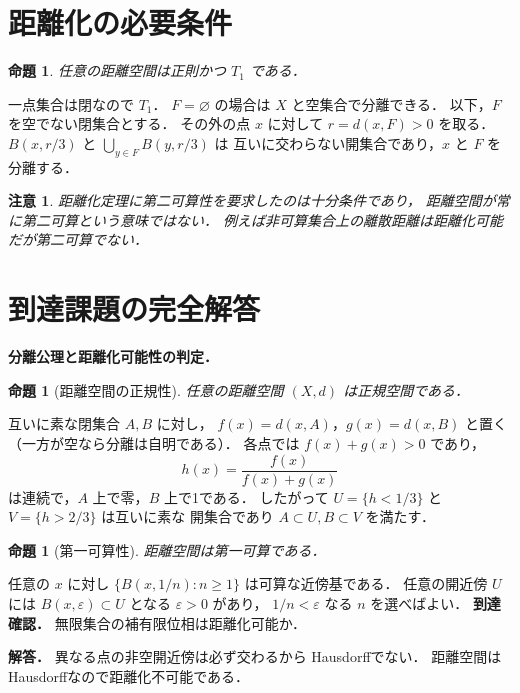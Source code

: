 \documentclass[a5paper,10pt,onecolumn]{jsarticle}
\makeatletter
\theoremstyle{mathnotetheorem}
\newtheorem{proposition}[theorem]{命題}
\newtheorem{remark}[theorem]{注意}
\renewcommand{\proofname}{証明}
\renewenvironment{proof}[1][\proofname]{%
  \par\pushQED{\qed}\normalfont\topsep4\p@\@plus2\p@\relax
  \trivlist\item[\hskip\labelsep\bfseries #1]\ignorespaces
}{\popQED\endtrivlist\@endpefalse}
\makeatother
\begin{document}
\section{距離化の必要条件}
\begin{proposition}
任意の距離空間は正則かつ $T_1$ である．
\end{proposition}
\begin{proof}
一点集合は閉なので $T_1$．
$F=\varnothing$ の場合は $X$ と空集合で分離できる．
以下，$F$ を空でない閉集合とする．
その外の点 $x$ に対して $r=d(x,F)>0$ を取る．
$B(x,r/3)$ と $\bigcup_{y\in F}B(y,r/3)$ は
互いに交わらない開集合であり，$x$ と $F$ を分離する．
\end{proof}
\begin{remark}
距離化定理に第二可算性を要求したのは十分条件であり，
距離空間が常に第二可算という意味ではない．
例えば非可算集合上の離散距離は距離化可能だが第二可算でない．
\end{remark}

\section{到達課題の完全解答}
\noindent\textbf{分離公理と距離化可能性の判定．}
\begin{proposition}[距離空間の正規性]
任意の距離空間 $(X,d)$ は正規空間である．
\end{proposition}
\begin{proof}
互いに素な閉集合 $A,B$ に対し，
$f(x)=d(x,A)$，$g(x)=d(x,B)$ と置く
（一方が空なら分離は自明である）．
各点では $f(x)+g(x)>0$ であり，
\[
h(x)=\frac{f(x)}{f(x)+g(x)}
\]
は連続で，$A$ 上で零，$B$ 上で1である．
したがって
$U=\{h<1/3\}$ と $V=\{h>2/3\}$ は互いに素な
開集合であり $A\subset U,B\subset V$ を満たす．
\end{proof}
\begin{proposition}[第一可算性]
距離空間は第一可算である．
\end{proposition}
\begin{proof}
任意の $x$ に対し
$\{B(x,1/n):n\ge1\}$ は可算な近傍基である．
任意の開近傍 $U$ には $B(x,\varepsilon)\subset U$
となる $\varepsilon>0$ があり，
$1/n<\varepsilon$ なる $n$ を選べばよい．
\end{proof}
\noindent\textbf{到達確認．}
無限集合の補有限位相は距離化可能か．
\par\noindent\textbf{解答．}
異なる点の非空開近傍は必ず交わるから
Hausdorffでない．
距離空間はHausdorffなので距離化不可能である．
\end{document}
